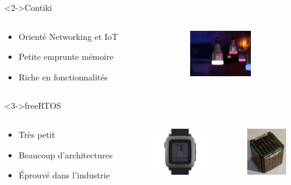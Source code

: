 \begin{frame}
	\begin{block}<2->{Contiki}
		\begin{columns}
		\begin{column}{0.50\textwidth}
		\begin{itemize}
			\item Orienté Networking et IoT
			\item Petite emprunte mémoire
			\item Riche en fonctionnalités
		\end{itemize}
		\end{column}
		\begin{column}{0.30\textwidth}
			\includegraphics[height=2cm]{img/amp.jpg}
		\end{column}
		\end{columns}
	\end{block}
	\begin{block}<3->{freeRTOS}
		\begin{columns}
			\begin{column}{0.50\textwidth}
				\begin{itemize}
					\item Très petit
					\item Beaucoup d'architectures
					\item Éprouvé dans l'industrie
				\end{itemize}
			\end{column}
			\begin{column}{0.20\textwidth}
				\includegraphics[height=2cm]{img/pt.jpg}
			\end{column}
			\begin{column}{0.20\textwidth}
				\includegraphics[height=2cm]{img/cubesat.jpg}
			\end{column}
		\end{columns}
	\end{block}
\end{frame}

